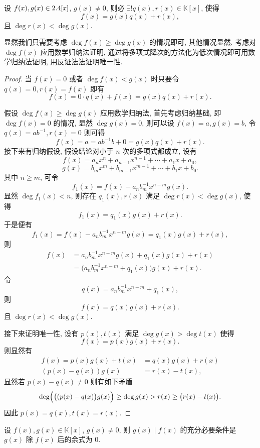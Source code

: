 \documentclass[cn,toc=twocol]{elegantbook}
\newcommand{\K}{\mathbb{K}}
\begin{document}
\begin{theorem}
	设 $f(x),g(x) \in 2.4[x]$, $g(x) \neq 0$, 则必 $\exists ! q(x), r(x) \in \K[x]$, 使得
	\[
		f(x) =g(x) q(x) + r(x),
	\]
	且 $\deg r(x) < \deg g(x)$.
\end{theorem}
\begin{idea*}
	显然我们只需要考虑 $\deg f(x) \ge \deg g(x)$ 的情况即可, 其他情况显然. 考虑对 $\deg f(x)$ 应用数学归纳法证明, 通过将多项式降次的方法化为低次情况即可用数学归纳法证明, 用反证法法证明唯一性.
\end{idea*}
\begin{proof}
	当 $f(x) = 0$ 或者 $\deg f(x) < g(x)$ 时只要令 $q(x) = 0, r(x) = f(x)$ 即有
	\[
		f(x)  = 0\cdot q(x) + f(x) = g(x) q(x) + r(x).
	\] 
	
	假设 $\deg f(x) \ge \deg g(x)$ 应用数学归纳法, 首先考虑归纳基础, 即 $\deg f(x) = 0$ 的情况, 显然 $\deg g(x) = 0$, 则可以设 $f(x) = a, g(x) = b$, 令 $q(x) = a b^{-1}, r(x) = 0$ 则可得
	\[
		f(x) = a = a b^{-1} b + 0 =  g(x) q(x) + r(x).
	\]
	接下来有归纳假设, 假设结论对小于 $n$ 次的多项式都成立, 设有
	\[
		f(x) = a_n x^n +a_{n-1} x^{n-1} + \cdots + a_1 x + a_0,
	\]
	\[
		g(x) = b_m x^m + b_{m-1} x^{m-1} + \cdots + b_1 x + b_0.
	\]
	其中 $n \ge m$, 可令
	\[
		f_1(x) = f(x) - a_n b_m^{-1} x^{n-m} g(x).
	\]
	显然 $\deg f_1(x) < n$, 则存在 $q_1(x), r(x)$ 满足 $\deg r(x) < \deg g(x)$, 使得
	\[
		f_1(x) = q_1(x) g(x) + r(x).
	\]
	于是便有
	\[
		f_1(x) = f(x) - a_n b_m^{-1} x^{n-m} g(x) = q_1(x) g(x) + r(x),
	\]
	则
	\[
	\begin{aligned}
		f(x) &= a_n b_m^{-1} x^{n-m} g(x) + q_1(x) g(x) + r(x)\\
		&= \bigl(a_n b_m^{-1} x^{n-m} + q_1(x)\bigr) g(x) + r(x).
	\end{aligned}
	\]
	令
	\[
		q(x) = a_n b_m^{-1} x^{n-m} + q_1(x),
	\]
	则
	\[
		f(x) = q(x) g(x) + r(x).
	\]
	且 $\deg r(x) < \deg g(x)$.
	
	接下来证明唯一性, 设有 $p(x), t(x)$ 满足 $\deg g(x) > \deg t(x)$ 使得
	\[
		f(x) = p(x) g(x) + r(x).
	\]
	则显然有
	\[
	\begin{aligned}
		f(x) = p(x) g(x) + t(x) &= q(x) g(x) + r(x)\\
		(p(x) - q(x)) g(x) &= r(x) - t(x),
	\end{aligned}
	\]
	显然若 $p(x) - q(x) \neq 0$ 则有如下矛盾
	\[
		\deg \Bigl(\bigl((p(x) - q(x)\bigr) g(x)\Bigr) \ge \deg g(x) > r(x) \ge \bigl(r(x) - t(x)\bigr).
	\]
	因此 $p(x) = q(x), t(x) = r(x)$.
\end{proof}

\begin{corollary}
	设 $f(x), g(x) \in \K[x]$, $g(x) \neq 0$, 则 $g(x) \mid f(x)$ 的充分必要条件是 $g(x)$ 除 $f(x)$ 后的余式为 $0$.
\end{corollary}
\end{document}
